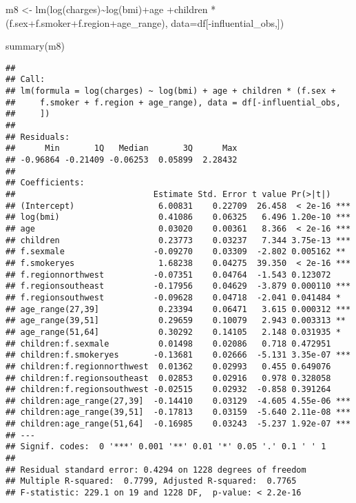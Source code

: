 \documentclass[
]{article}
\newenvironment{Shaded}{\begin{snugshade}}{\end{snugshade}}
\newcommand{\AttributeTok}[1]{\textcolor[rgb]{0.77,0.63,0.00}{#1}}
\newcommand{\FunctionTok}[1]{\textcolor[rgb]{0.00,0.00,0.00}{#1}}
\newcommand{\NormalTok}[1]{#1}
\newcommand{\OtherTok}[1]{\textcolor[rgb]{0.56,0.35,0.01}{#1}}
\newcommand{\SpecialCharTok}[1]{\textcolor[rgb]{0.00,0.00,0.00}{#1}}
\begin{document}
\begin{Shaded}
\begin{Highlighting}[]
\NormalTok{m8 }\OtherTok{\textless{}{-}} \FunctionTok{lm}\NormalTok{(}\FunctionTok{log}\NormalTok{(charges)}\SpecialCharTok{\textasciitilde{}}\FunctionTok{log}\NormalTok{(bmi)}\SpecialCharTok{+}\NormalTok{age}
         \SpecialCharTok{+}\NormalTok{children }\SpecialCharTok{*}\NormalTok{ (f.sex}\SpecialCharTok{+}\NormalTok{f.smoker}\SpecialCharTok{+}\NormalTok{f.region}\SpecialCharTok{+}\NormalTok{age\_range), }\AttributeTok{data=}\NormalTok{df[}\SpecialCharTok{{-}}\NormalTok{influential\_obs,])}

\FunctionTok{summary}\NormalTok{(m8)}
\end{Highlighting}
\end{Shaded}

\begin{verbatim}
## 
## Call:
## lm(formula = log(charges) ~ log(bmi) + age + children * (f.sex + 
##     f.smoker + f.region + age_range), data = df[-influential_obs, 
##     ])
## 
## Residuals:
##      Min       1Q   Median       3Q      Max 
## -0.96864 -0.21409 -0.06253  0.05899  2.28432 
## 
## Coefficients:
##                            Estimate Std. Error t value Pr(>|t|)    
## (Intercept)                 6.00831    0.22709  26.458  < 2e-16 ***
## log(bmi)                    0.41086    0.06325   6.496 1.20e-10 ***
## age                         0.03020    0.00361   8.366  < 2e-16 ***
## children                    0.23773    0.03237   7.344 3.75e-13 ***
## f.sexmale                  -0.09270    0.03309  -2.802 0.005162 ** 
## f.smokeryes                 1.68238    0.04275  39.350  < 2e-16 ***
## f.regionnorthwest          -0.07351    0.04764  -1.543 0.123072    
## f.regionsoutheast          -0.17956    0.04629  -3.879 0.000110 ***
## f.regionsouthwest          -0.09628    0.04718  -2.041 0.041484 *  
## age_range(27,39]            0.23394    0.06471   3.615 0.000312 ***
## age_range(39,51]            0.29659    0.10079   2.943 0.003313 ** 
## age_range(51,64]            0.30292    0.14105   2.148 0.031935 *  
## children:f.sexmale          0.01498    0.02086   0.718 0.472951    
## children:f.smokeryes       -0.13681    0.02666  -5.131 3.35e-07 ***
## children:f.regionnorthwest  0.01362    0.02993   0.455 0.649076    
## children:f.regionsoutheast  0.02853    0.02916   0.978 0.328058    
## children:f.regionsouthwest -0.02515    0.02932  -0.858 0.391264    
## children:age_range(27,39]  -0.14410    0.03129  -4.605 4.55e-06 ***
## children:age_range(39,51]  -0.17813    0.03159  -5.640 2.11e-08 ***
## children:age_range(51,64]  -0.16985    0.03243  -5.237 1.92e-07 ***
## ---
## Signif. codes:  0 '***' 0.001 '**' 0.01 '*' 0.05 '.' 0.1 ' ' 1
## 
## Residual standard error: 0.4294 on 1228 degrees of freedom
## Multiple R-squared:  0.7799, Adjusted R-squared:  0.7765 
## F-statistic: 229.1 on 19 and 1228 DF,  p-value: < 2.2e-16
\end{verbatim}
\end{document}
